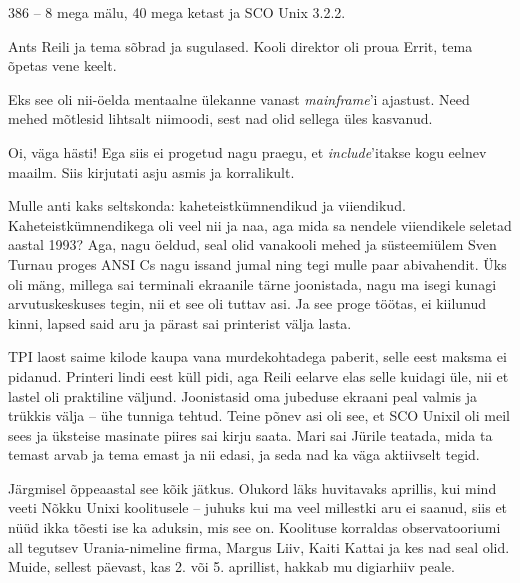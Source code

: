 
386 -- 8 mega mälu, 40 mega ketast ja SCO Unix 3.2.2. 


Ants Reili ja tema sõbrad ja sugulased. Kooli direktor 
oli proua Errit, tema õpetas vene keelt. 

Eks see oli nii-öelda mentaalne ülekanne vanast \emph{mainframe}'i ajastust. Need mehed mõtlesid lihtsalt niimoodi, sest nad olid sellega üles 
kasvanud. 


Oi, väga hästi! Ega siis ei progetud nagu praegu, et \emph{include}'itakse 
kogu eelnev maailm. Siis kirjutati asju asmis ja korralikult. 

Mulle anti kaks seltskonda: kaheteistkümnendikud ja viiendikud. 
Kaheteistkümnendikega oli veel nii ja naa, aga mida sa nendele viiendikele seletad 
aastal 1993? Aga, nagu öeldud, 
seal olid vanakooli mehed ja süsteemiülem
Sven Turnau proges ANSI Cs 
nagu issand jumal ning tegi mulle paar abivahendit. Üks oli mäng, millega 
sai terminali ekraanile tärne joonistada, nagu ma isegi kunagi arvutuskeskuses 
tegin, nii et see oli tuttav asi. Ja see proge töötas, ei kiilunud kinni, lapsed said aru ja pärast sai printerist välja lasta. 

TPI laost saime kilode kaupa vana murdekohtadega paberit, selle 
eest maksma ei pidanud. Printeri lindi eest küll pidi, aga Reili eelarve elas 
selle kuidagi üle, nii et lastel oli praktiline väljund. 
Joonistasid oma jubeduse ekraani peal valmis ja trükkis välja -- ühe tunniga 
tehtud. Teine põnev asi oli see, et SCO Unixil oli meil
sees ja üksteise masinate piires sai kirju saata. Mari sai Jürile 
teatada, mida ta temast arvab ja tema emast ja nii edasi, ja seda nad ka väga 
aktiivselt tegid. 

Järgmisel õppeaastal see kõik jätkus. Olukord läks huvitavaks 
aprillis, kui mind veeti Nõkku Unixi 
koolitusele -- juhuks kui ma veel millestki aru ei saanud, siis et nüüd ikka 
tõesti ise ka aduksin, mis see on. Koolituse korraldas observatooriumi all tegutsev Urania-nimeline firma, Margus Liiv, Kaiti 
Kattai ja kes nad seal olid. Muide, sellest päevast, kas 2. või 5. aprillist, 
hakkab mu digiarhiiv peale.  

